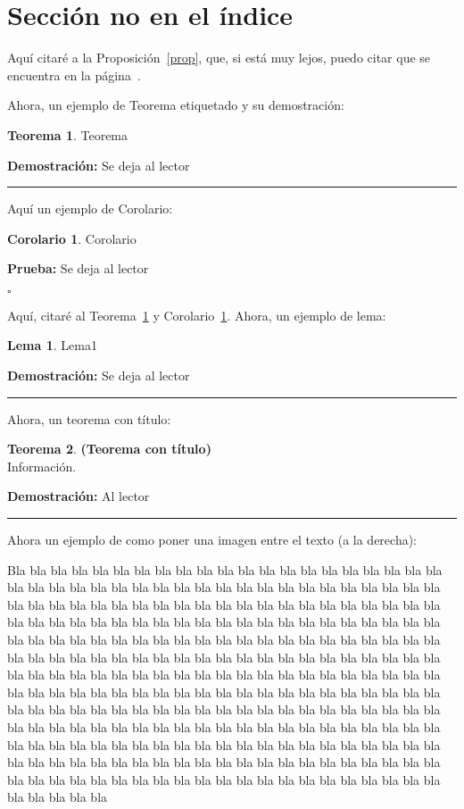\documentclass[12pt]{book}%
\theoremstyle{definition}%
\newtheorem{teo}{Teorema}[chapter]
\newtheorem{lema}{Lema}[chapter]
\newtheorem{cor}{Corolario}[chapter]
\newenvironment{pba}{\noindent\textbf{Prueba:}}{\begin{flushright} $\square$ \end{flushright}}
\newenvironment{dem}{\noindent\textbf{Demostración:}}{\begin{flushright} \rule{1ex}{1ex} \end{flushright}}
\begin{document}
\section*{Sección no en el índice}

Aquí citaré a la Proposición~\ref{prop}, que, si está muy lejos, puedo citar que se encuentra en la página~\pageref{prop}.

Ahora, un ejemplo de Teorema etiquetado y su demostración:

\begin{teo}\label{teo}
Teorema
\end{teo}
\begin{dem}
Se deja al lector
\end{dem}

Aquí un ejemplo de Corolario:

\begin{cor}\label{cor}
Corolario
\end{cor}
\begin{pba}
Se deja al lector
\end{pba}


Aquí, citaré al Teorema~\ref{teo} y Corolario~\ref{cor}. Ahora, un ejemplo de lema:

\begin{lema} \label{lema1}
Lema1
\end{lema}
\begin{dem}
Se deja al lector
\end{dem}

Ahora, un teorema con título:

\begin{teo} \textbf{(Teorema con título)}\label{teotitulo}\\
Información.
\end{teo}
\begin{dem}
Al lector
\end{dem}


Ahora un ejemplo de como poner una imagen entre el texto (a la derecha):


Bla bla bla bla bla bla bla bla bla bla bla bla bla bla bla bla bla bla bla bla bla bla bla bla bla bla bla bla bla bla bla bla bla bla bla bla bla bla bla bla bla bla bla bla bla bla bla bla bla bla bla bla bla bla bla bla bla bla bla bla bla bla bla bla bla bla bla bla bla bla bla bla bla bla bla bla bla bla bla bla bla bla bla bla bla bla bla bla bla bla bla bla bla bla bla bla bla bla bla bla bla bla bla bla bla bla bla bla bla bla bla bla bla bla bla bla bla bla bla bla bla bla bla bla bla bla bla bla bla bla bla bla bla bla bla bla bla bla bla bla bla bla bla bla bla bla bla bla bla bla bla bla bla bla bla bla bla bla bla bla bla bla bla bla bla bla bla bla bla bla bla bla bla bla bla bla bla bla bla bla bla bla bla bla bla bla bla bla bla bla bla bla bla bla bla bla bla bla bla bla bla bla bla bla bla bla bla bla bla bla bla bla bla bla bla bla bla bla bla bla bla bla bla bla bla bla bla bla bla bla bla bla bla bla bla bla bla bla bla bla bla bla bla bla bla bla bla bla bla bla bla bla bla bla bla bla bla bla bla bla bla bla bla bla bla bla bla bla bla bla bla bla bla bla bla bla bla bla
\end{document}
